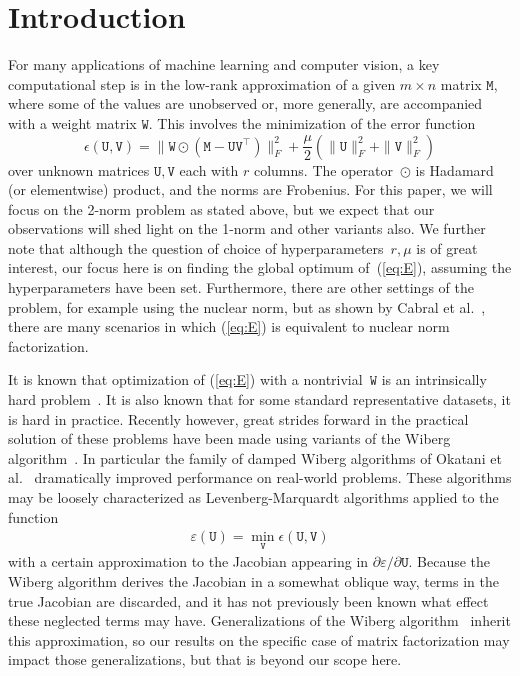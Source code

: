 \documentclass[runningheads]{llncs}
\def\eqref#1{(\ref{eq:#1})}
\def\eqlabel#1{\label{eq:#1}}
\def\tr{^\top}
\def\hadamard{\odot}
\def\m#1{\ensuremath{\mathtt{#1}}}
\def\mU{\m U}
\def\mV{\m V}
\def\mW{\m W}
\def\err{\epsilon}
\begin{document}
\section{Introduction}
For many applications of machine learning and computer vision, a key computational step is in the low-rank approximation of a given $m\times n$ matrix $\m M$, where some of the values are unobserved or, more generally, are accompanied with a weight matrix \mW.    This involves the minimization of the error function
\def\fro#1{\|#1\|_F^2}
\begin{equation}
\err(\m U,\m V) = \fro{\mW\hadamard(\m M -\m U \m V\tr)} + \frac\mu2(\fro \mU + \fro \mV)
\eqlabel{E}
\end{equation}
over unknown matrices $\m U, \m V$ each with $r$ columns.   The operator~$\hadamard$ is Hadamard (or elementwise) product, and the norms are Frobenius.  For this paper, we will focus on the 2-norm problem as stated above, but we expect that our observations will shed light on the 1-norm and other variants also.  We further note that although the question of choice of hyperparameters~$r, \mu$ is of great interest, our focus here is on finding the global optimum of~\eqref{E}, assuming the hyperparameters have been set.  Furthermore, there are other settings of the problem, for example using the nuclear norm, but as shown by Cabral et al.~\cite{cabral2013unifying}, there are many scenarios in which \eqref{E} is equivalent to nuclear norm factorization.

It is known that optimization of \eqref{E} with a nontrivial~$\mW$ is an intrinsically hard problem~\cite{cabral2013unifying}.   It is also known that for some standard representative datasets, it is hard in practice.   Recently however, great strides forward in the practical solution of these problems have been made using variants of the Wiberg algorithm~\cite{Wiberg76}.   In particular the family of damped Wiberg algorithms of Okatani et al.~\cite{okatani2011efficient} dramatically improved performance on real-world problems.   These algorithms may be loosely characterized as Levenberg-Marquardt algorithms applied to the function
\def\erru{\varepsilon}
\def\verru{{\boldsymbol\varepsilon}}
\begin{align}
\erru(\mU) = \min_\mV \err(\m U, \m V)
\end{align}
with a certain approximation to the Jacobian appearing in $\partial\erru/\partial\mU$.  Because the Wiberg algorithm derives the Jacobian in a somewhat oblique way, terms in the true Jacobian are discarded, and it has not previously been known what effect these neglected terms may have.   Generalizations of the Wiberg algorithm~\cite{strelow2012general} inherit this approximation, so our results on the specific case of matrix factorization may impact those generalizations, but that is beyond our scope here.
\end{document}
